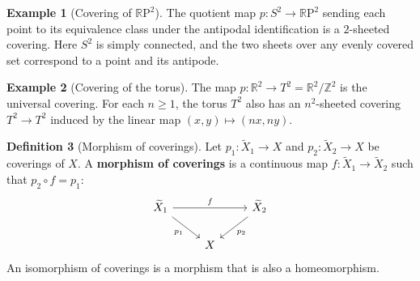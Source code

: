 \documentclass[12pt,a4paper,openany]{book}
\theoremstyle{definition}
\newtheorem{definition}{Definition}[chapter]
\newtheorem{example}[definition]{Example}
\theoremstyle{plain}
\theoremstyle{remark}
\newcommand{\Z}{\mathbb{Z}}
\newcommand{\R}{\mathbb{R}}
\newcommand{\RP}{\mathbb{R}\mathrm{P}}
\begin{document}
\begin{example}[Covering of $\RP^2$]\label{ex:covering-RP2}
  The quotient map $p\colon S^2 \to \RP^2$ sending each point to its
  equivalence class under the antipodal identification is a $2$-sheeted
  covering.  Here $S^2$ is simply connected, and the two sheets over any
  evenly covered set correspond to a point and its antipode.
\end{example}

\begin{example}[Covering of the torus]\label{ex:covering-torus}
  The map $p\colon \R^2 \to T^2 = \R^2/\Z^2$ is the universal covering.
  For each $n \geq 1$, the torus $T^2$ also has an $n^2$-sheeted covering
  $T^2 \to T^2$ induced by the linear map $(x,y) \mapsto (nx, ny)$.

  \begin{center}
  \end{center}
\end{example}

\begin{definition}[Morphism of coverings]\label{def:covering-morphism}
  Let $p_1\colon \widetilde{X}_1 \to X$ and $p_2\colon \widetilde{X}_2 \to X$
  be coverings of $X$.  A \textbf{morphism of coverings} is a continuous map
  $f\colon \widetilde{X}_1 \to \widetilde{X}_2$ such that $p_2 \circ f = p_1$:
  \[
    \begin{tikzcd}
      \widetilde{X}_1 \ar[rr,"f"] \ar[dr,"p_1"'] & & \widetilde{X}_2 \ar[dl,"p_2"] \\
      & X &
    \end{tikzcd}
  \]
  An isomorphism of coverings is a morphism that is also a homeomorphism.
\end{definition}
\end{document}

